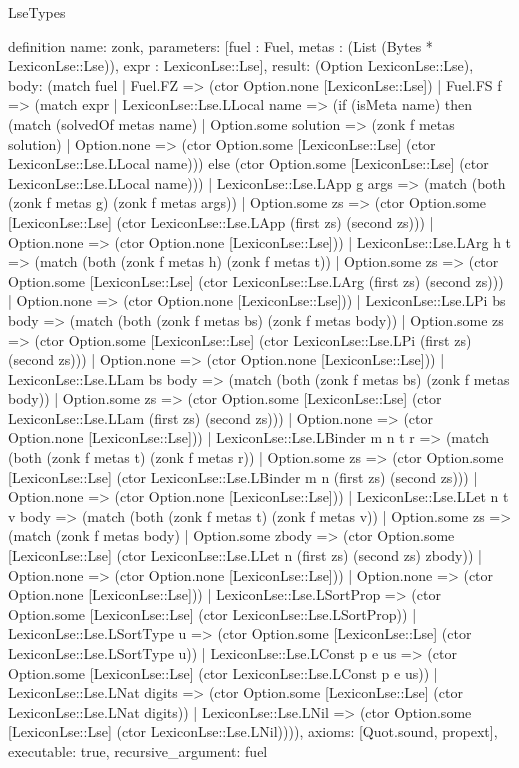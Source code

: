 \begin{lexlean}{LseTypes}
\begin{semanticmodule}
definition{
  name: zonk,
  parameters: [fuel : Fuel, metas : (List (Bytes * LexiconLse::Lse)), expr : LexiconLse::Lse],
  result: (Option LexiconLse::Lse),
  body: (match fuel
    | Fuel.FZ => (ctor Option.none [LexiconLse::Lse])
    | Fuel.FS f => (match expr
      | LexiconLse::Lse.LLocal name => (if (isMeta name) then (match (solvedOf metas name)
        | Option.some solution => (zonk f metas solution)
        | Option.none => (ctor Option.some [LexiconLse::Lse] (ctor LexiconLse::Lse.LLocal name))) else (ctor Option.some [LexiconLse::Lse] (ctor LexiconLse::Lse.LLocal name)))
      | LexiconLse::Lse.LApp g args => (match (both (zonk f metas g) (zonk f metas args))
        | Option.some zs => (ctor Option.some [LexiconLse::Lse] (ctor LexiconLse::Lse.LApp (first zs) (second zs)))
        | Option.none => (ctor Option.none [LexiconLse::Lse]))
      | LexiconLse::Lse.LArg h t => (match (both (zonk f metas h) (zonk f metas t))
        | Option.some zs => (ctor Option.some [LexiconLse::Lse] (ctor LexiconLse::Lse.LArg (first zs) (second zs)))
        | Option.none => (ctor Option.none [LexiconLse::Lse]))
      | LexiconLse::Lse.LPi bs body => (match (both (zonk f metas bs) (zonk f metas body))
        | Option.some zs => (ctor Option.some [LexiconLse::Lse] (ctor LexiconLse::Lse.LPi (first zs) (second zs)))
        | Option.none => (ctor Option.none [LexiconLse::Lse]))
      | LexiconLse::Lse.LLam bs body => (match (both (zonk f metas bs) (zonk f metas body))
        | Option.some zs => (ctor Option.some [LexiconLse::Lse] (ctor LexiconLse::Lse.LLam (first zs) (second zs)))
        | Option.none => (ctor Option.none [LexiconLse::Lse]))
      | LexiconLse::Lse.LBinder m n t r => (match (both (zonk f metas t) (zonk f metas r))
        | Option.some zs => (ctor Option.some [LexiconLse::Lse] (ctor LexiconLse::Lse.LBinder m n (first zs) (second zs)))
        | Option.none => (ctor Option.none [LexiconLse::Lse]))
      | LexiconLse::Lse.LLet n t v body => (match (both (zonk f metas t) (zonk f metas v))
        | Option.some zs => (match (zonk f metas body)
          | Option.some zbody => (ctor Option.some [LexiconLse::Lse] (ctor LexiconLse::Lse.LLet n (first zs) (second zs) zbody))
          | Option.none => (ctor Option.none [LexiconLse::Lse]))
        | Option.none => (ctor Option.none [LexiconLse::Lse]))
      | LexiconLse::Lse.LSortProp => (ctor Option.some [LexiconLse::Lse] (ctor LexiconLse::Lse.LSortProp))
      | LexiconLse::Lse.LSortType u => (ctor Option.some [LexiconLse::Lse] (ctor LexiconLse::Lse.LSortType u))
      | LexiconLse::Lse.LConst p e us => (ctor Option.some [LexiconLse::Lse] (ctor LexiconLse::Lse.LConst p e us))
      | LexiconLse::Lse.LNat digits => (ctor Option.some [LexiconLse::Lse] (ctor LexiconLse::Lse.LNat digits))
      | LexiconLse::Lse.LNil => (ctor Option.some [LexiconLse::Lse] (ctor LexiconLse::Lse.LNil)))),
  axioms: [Quot.sound, propext],
  executable: true,
  recursive_argument: fuel
}


\end{semanticmodule}
\end{lexlean}

